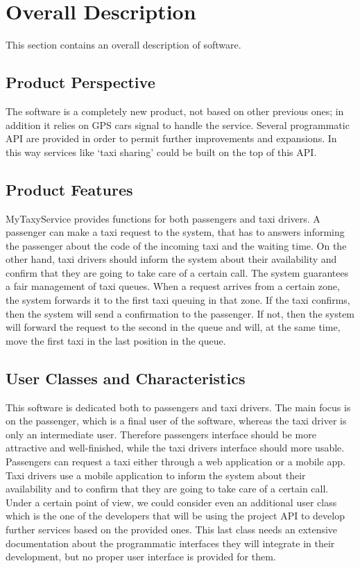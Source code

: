 \section{Overall Description}
This section contains an overall description of \myTaxiService{} software.
\subsection{Product Perspective}
The software is a completely new product, not based on other previous ones; in addition it relies on GPS cars signal to handle the service. Several programmatic API are provided in order to permit further improvements and expansions. In this way services like ‘taxi sharing’ could be built on the top of this API.
\subsection{Product Features}
MyTaxyService provides functions for both passengers and taxi drivers.
A passenger can make a taxi request to the system, that has to answers informing the passenger about the code of the incoming taxi and the waiting time.
On the other hand, taxi drivers should inform the system about their availability and confirm that they are going to take care of a certain call. The system guarantees a fair management of taxi queues. When a request arrives from a certain zone, the system forwards it to the first taxi queuing in that zone. If the taxi confirms, then the system will send a confirmation to the passenger. If not, then the system will forward the request to the second in the queue and will, at the same time, move the first taxi in the last position in the queue.
\subsection{User Classes and Characteristics}
This software is dedicated both to passengers and taxi drivers. The main focus is on the passenger, which is a final user of the software, whereas the taxi driver is only an intermediate user. Therefore passengers interface should be more attractive and well-finished, while the taxi drivers interface should more usable.
Passengers can request a taxi either through a web application or a mobile app.
Taxi drivers use a mobile application to inform the system about their availability and to confirm that they are going to take care of a certain call.
Under a certain point of view, we could consider even an additional user class which is the one of the developers that will be using the project API to develop further services based on the provided ones.
This last class needs an extensive documentation about the programmatic interfaces they will integrate in their development, but no proper user interface is provided for them.
